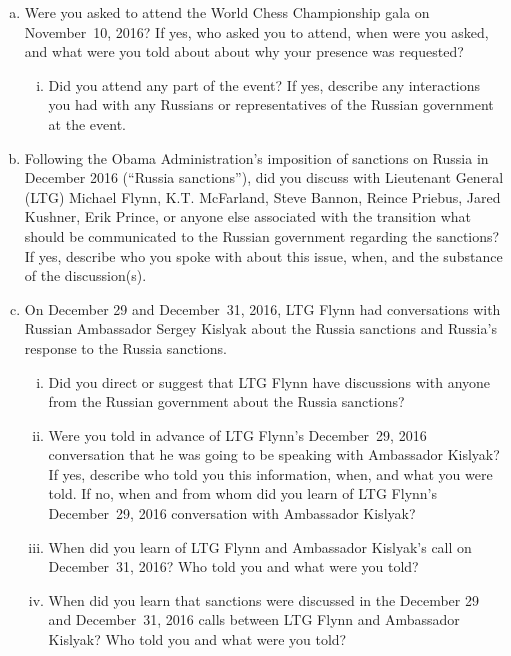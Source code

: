 \begin{enumerate}[a.]

\item Were you asked to attend the World Chess Championship gala on November~10, 2016?
If yes, who asked you to attend, when were you asked, and what were you told about about why your presence was requested?

\begin{enumerate}[i.]

\item Did you attend any part of the event?
If yes, describe any interactions you had with any Russians or representatives of the Russian government at the event.

\end{enumerate}

\item Following the Obama Administration's imposition of sanctions on Russia in December 2016 (``Russia sanctions''), did you discuss with Lieutenant General (LTG) Michael Flynn, K.T. McFarland, Steve Bannon, Reince Priebus, Jared Kushner, Erik Prince, or anyone else associated with the transition what should be communicated to the Russian government regarding the sanctions?
If yes, describe who you spoke with about this issue, when, and the substance of the discussion(s).

\item On December 29 and December~31, 2016, LTG Flynn had conversations with Russian Ambassador Sergey Kislyak about the Russia sanctions and Russia's response to the Russia sanctions.

\begin{enumerate}[i.]

\item Did you direct or suggest that LTG Flynn have discussions with anyone from the Russian government about the Russia sanctions?

\item Were you told in advance of LTG Flynn's December~29, 2016 conversation that he was going to be speaking with Ambassador Kislyak?
If yes, describe who told you this information, when, and what you were told.
If no, when and from whom did you learn of LTG Flynn's December~29, 2016 conversation with Ambassador Kislyak?

\item When did you learn of LTG Flynn and Ambassador Kislyak's call on December~31, 2016? Who told you and what were you told?

\item When did you learn that sanctions were discussed in the December 29 and December~31, 2016 calls between LTG Flynn and Ambassador Kislyak?
Who told you and what were you told?


\end{enumerate}
\end{enumerate}
